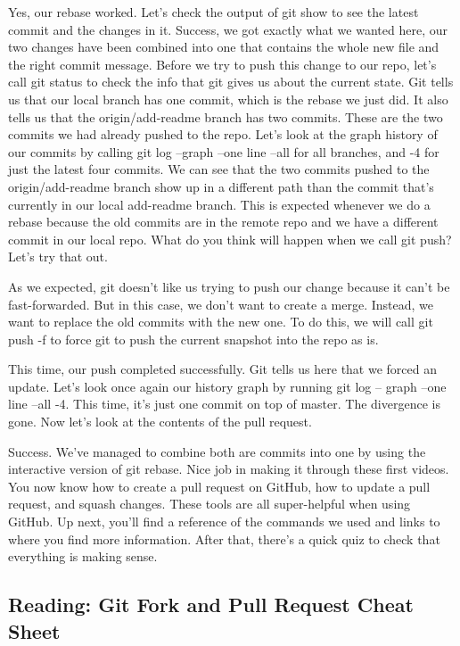 	Yes, our rebase worked. Let's check the output of git show to see the latest commit and the changes in it. Success, we got exactly what we wanted here, our two changes have been combined into one that contains the whole new file and the right commit message. Before we try to push this change to our repo, let's call git status to check the info that git gives us about the current state. Git tells us that our local branch has one commit, which is the rebase we just did. It also tells us that the origin/add-readme branch has two commits. These are the two commits we had already pushed to the repo. Let's look at the graph history of our commits by calling git log --graph --one line --all for all branches, and -4 for just the latest four commits. We can see that the two commits pushed to the origin/add-readme branch show up in a different path than the commit that's currently in our local add-readme branch. This is expected whenever we do a rebase because the old commits are in the remote repo and we have a different commit in our local repo. What do you think will happen when we call git push? Let's try that out.
	
	As we expected, git doesn't like us trying to push our change because it can't be fast-forwarded. But in this case, we don't want to create a merge. Instead, we want to replace the old commits with the new one. To do this, we will call git push -f to force git to push the current snapshot into the repo as is.
	
	This time, our push completed successfully. Git tells us here that we forced an update. Let's look once again our history graph by running git log -- graph --one line --all -4. This time, it's just one commit on top of master. The divergence is gone. Now let's look at the contents of the pull request.
	
	Success. We've managed to combine both are commits into one by using the interactive version of git rebase. Nice job in making it through these first videos. You now know how to create a pull request on GitHub, how to update a pull request, and squash changes. These tools are all super-helpful when using GitHub. Up next, you'll find a reference of the commands we used and links to where you find more information. After that, there's a quick quiz to check that everything is making sense.
	
	\subsection{Reading: Git Fork and Pull Request Cheat Sheet}

